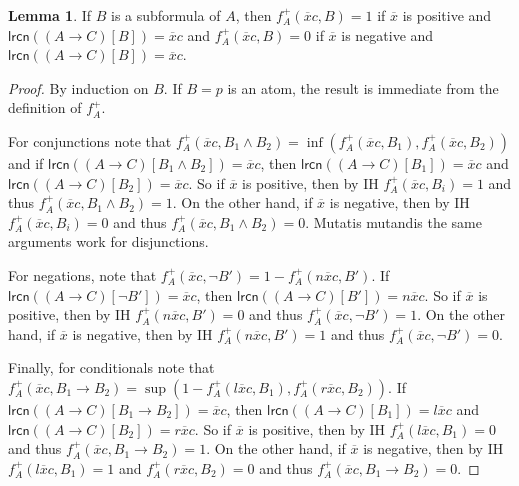 \documentclass{amsart}
\theoremstyle{definition}
\newtheorem{lemma}{Lemma}
\newcommand{\lrcn}{\mathsf{lrcn}}
\begin{document}
\begin{lemma}
    If $B$ is a subformula of $A$, then $f^+_A(\overline{x}c,B)=1$ if $\overline{x}$ is positive and $\lrcn((A\to C)[B])=\overline{x}c$ and $f^+_A(\overline{x}c,B)=0$ if $\overline{x}$ is negative and $\lrcn((A\to C)[B])=\overline{x}c$.
\end{lemma}
\begin{proof}
    By induction on $B$. If $B=p$ is an atom, the result is immediate from the definition of $f^+_A$. 

    For conjunctions note that $f^+_A(\overline{x}c,B_1\land B_2)=\inf(f^+_A(\overline{x}c,B_1),f^+_A(\overline{x}c,B_2))$ and if $\lrcn((A\to C)[B_1\land B_2])=\overline{x}c$, then $\lrcn((A\to C)[B_1])=\overline{x}c$ and $\lrcn((A\to C)[B_2])=\overline{x}c$. So if $\overline{x}$ is positive, then by IH $f^+_A(\overline{x}c,B_i)=1$ and thus $f^+_A(\overline{x}c,B_1\land B_2)=1$. On the other hand, if $\overline{x}$ is negative, then by IH $f^+_A(\overline{x}c,B_i)=0$ and thus $f^+_A(\overline{x}c,B_1\land B_2)=0$. Mutatis mutandis the same arguments work for disjunctions.

    For negations, note that $f^+_A(\overline{x}c,\neg B')=1-f^+_A(n\overline{x}c,B')$. If $\lrcn((A\to C)[\neg B'])=\overline{x}c$, then $\lrcn((A\to C)[B'])=n\overline{x}c$. So if $\overline{x}$ is positive, then by IH $f^+_A(n\overline{x}c,B')=0$ and thus $f^+_A(\overline{x}c,\neg B')=1$. On the other hand, if $\overline{x}$ is negative, then by IH $f^+_A(n\overline{x}c,B')=1$ and thus $f^+_A(\overline{x}c,\neg B')=0$. 

    Finally, for conditionals note that $f^+_A(\overline{x}c,B_1\to B_2)=\sup(1-f^+_A(l\overline{x}c,B_1),f^+_A(r\overline{x}c,B_2))$. If $\lrcn((A\to C)[B_1\to B_2])=\overline{x}c$, then $\lrcn((A\to C)[B_1])=l\overline{x}c$ and $\lrcn((A\to C)[B_2])=r\overline{x}c$. So if $\overline{x}$ is positive, then by IH $f^+_A(l\overline{x}c,B_1)=0$ and thus $f^+_A(\overline{x}c,B_1\to B_2)=1$. On the other hand, if $\overline{x}$ is negative, then by IH $f^+_A(l\overline{x}c,B_1)=1$ and $f^+_A(r\overline{x}c,B_2)=0$ and thus $f^+_A(\overline{x}c,B_1\to B_2)=0$. 
\end{proof}
\end{document}
